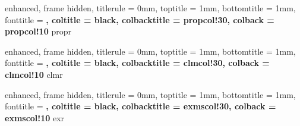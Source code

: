 

{
    enhanced,
    frame hidden,
    titlerule = 0mm,
    toptitle = 1mm,
    bottomtitle = 1mm,
    fonttitle = \bfseries\large,
    coltitle = black,
    colbacktitle = propcol!30,
    colback = propcol!10
}{propr}



{
    enhanced,
    frame hidden,
    titlerule = 0mm,
    toptitle = 1mm,
    bottomtitle = 1mm,
    fonttitle = \bfseries\large,
    coltitle = black,
    colbacktitle = clmcol!30,
    colback = clmcol!10
}{clmr}



{
    enhanced,
    frame hidden,
    titlerule = 0mm,
    toptitle = 1mm,
    bottomtitle = 1mm,
    fonttitle = \bfseries\large,
    coltitle = black,
    colbacktitle = exmscol!30,
    colback = exmscol!10
}{exr}




\renewenvironment{proof}{
    {\noindent{\it Proof.}}
    \tcolorbox[blanker, breakable, left=5mm, parbox=false, before upper={\parindent15pt}, after skip=10pt, borderline west={1mm}{0pt}{thmcol!30}]
}{
    \textcolor{thmcol!30}{\hbox{}\nobreak\hfill$\blacksquare$}
    \endtcolorbox
}